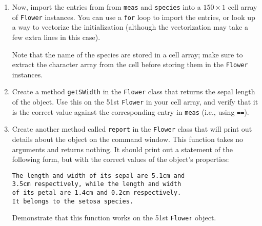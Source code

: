 \documentclass{article}
\begin{document}
\begin{enumerate}
\begin{enumerate}
			\clearpage
			\item Now, import the entries from from \lstinline|meas| and \lstinline|species| into a $150\times 1$ cell array of \lstinline|Flower| instances. You can use a \lstinline|for| loop to import the entries, or look up a way to vectorize the initialization (although the vectorization may take a few extra lines in this case).
			
			Note that the name of the species are stored in a cell array; make sure to extract the character array from the cell before storing them in the \lstinline|Flower| instances.
			
			\item Create a method \lstinline|getSWidth| in the \lstinline|Flower| class that returns the sepal length of the object. Use this on the 51st \lstinline|Flower| in your cell array, and verify that it is the correct value against the corresponding entry in \lstinline|meas| (i.e., using \lstinline|==|). 
			
			\item Create another method called \lstinline|report| in the \lstinline[]|Flower| class that will print out details about the object on the command window. This function takes no arguments and returns nothing. It should print out a statement of the following form, but with the correct values of the object's properties:
			\begin{lstlisting}[basicstyle=\ttfamily\color{black}]
The length and width of its sepal are 5.1cm and
3.5cm respectively, while the length and width
of its petal are 1.4cm and 0.2cm respectively.
It belongs to the setosa species.
			\end{lstlisting}
			Demonstrate that this function works on the 51st \lstinline|Flower| object.
		\end{enumerate}
	\end{enumerate}
	
\end{document}
